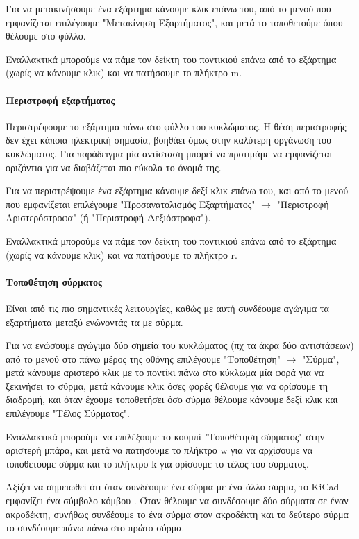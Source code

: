 \documentclass[a4paper]{article}
\begin{document}
Για να μετακινήσουμε ένα εξάρτημα κάνουμε κλικ επάνω του, από το μενού που εμφανίζεται επιλέγουμε "Μετακίνηση Εξαρτήματος", και μετά το τοποθετούμε όπου θέλουμε στο φύλλο. 

Εναλλακτικά μπορούμε να πάμε τον δείκτη του ποντικιού επάνω από το εξάρτημα (χωρίς να κάνουμε κλικ) και να πατήσουμε το πλήκτρο m.

\paragraph{Περιστροφή εξαρτήματος}
Περιστρέφουμε το εξάρτημα πάνω στο φύλλο του κυκλώματος. Η θέση περιστροφής δεν έχει κάποια ηλεκτρική σημασία, βοηθάει όμως στην καλύτερη οργάνωση του κυκλώματος. Για παράδειγμα μία αντίσταση μπορεί να προτιμάμε να εμφανίζεται οριζόντια για να διαβάζεται πιο εύκολα το όνομά της.

Για να περιστρέψουμε ένα εξάρτημα κάνουμε δεξί κλικ επάνω του, και από το μενού που εμφανίζεται επιλέγουμε "Προσανατολισμός Εξαρτήματος" $\rightarrow$ "Περιστροφή Αριστερόστροφα" (ή "Περιστροφή Δεξιόστροφα"). 

Εναλλακτικά μπορούμε να πάμε τον δείκτη του ποντικιού επάνω από το εξάρτημα (χωρίς να κάνουμε κλικ) και να πατήσουμε το πλήκτρο r.

\paragraph{Τοποθέτηση σύρματος}
Είναι από τις πιο σημαντικές λειτουργίες, καθώς με αυτή συνδέουμε αγώγιμα τα εξαρτήματα μεταξύ ενώνοντάς τα με σύρμα.

Για να ενώσουμε αγώγιμα δύο σημεία του κυκλώματος (πχ τα άκρα δύο αντιστάσεων) από το μενού στο πάνω μέρος της οθόνης επιλέγουμε "Τοποθέτηση" $\rightarrow$ "Σύρμα", μετά κάνουμε αριστερό κλικ με το ποντίκι πάνω στο κύκλωμα μία φορά για να ξεκινήσει το σύρμα, μετά κάνουμε κλικ όσες φορές θέλουμε για να ορίσουμε τη διαδρομή, και όταν έχουμε τοποθετήσει όσο σύρμα θέλουμε κάνουμε δεξί κλικ και επιλέγουμε "Τέλος Σύρματος". 

Εναλλακτικά μπορούμε να επιλέξουμε το κουμπί "Τοποθέτηση σύρματος" %
στην αριστερή μπάρα, και μετά να πατήσουμε το πλήκτρο w για να αρχίσουμε να τοποθετούμε σύρμα και το πλήκτρο k για ορίσουμε το τέλος του σύρματος.

Αξίζει να σημειωθεί ότι όταν συνδέουμε ένα σύρμα με ένα άλλο σύρμα, το \textenglish{KiCad} εμφανίζει ένα σύμβολο κόμβου %
. Όταν θέλουμε να συνδέσουμε δύο σύρματα σε έναν ακροδέκτη, συνήθως συνδέουμε το ένα σύρμα στον ακροδέκτη και το δεύτερο σύρμα το συνδέουμε πάνω πάνω στο πρώτο σύρμα.
\end{document}
